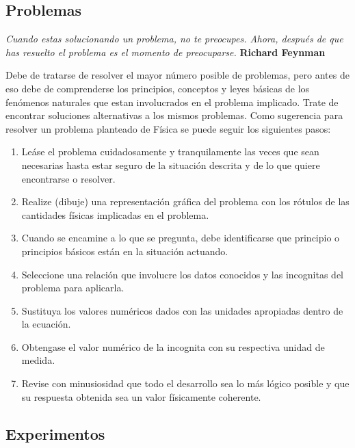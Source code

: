 \subsection*{Problemas}


\textit{Cuando estas solucionando un problema, no te preocupes. Ahora, después de que has resuelto el problema es el momento de 
preocuparse.} \textbf{Richard Feynman}
\vspace{1.0cm}

Debe de tratarse de resolver el mayor número posible de problemas, pero antes de eso debe de comprenderse los principios, 
conceptos y leyes básicas de los fenómenos naturales que estan involucrados en el problema implicado. Trate de encontrar 
soluciones alternativas a los mismos problemas. Como sugerencia para resolver un problema planteado de Física se puede seguir los 
siguientes pasos:\\

\begin{enumerate}
\item Leáse el problema cuidadosamente y tranquilamente las veces que sean necesarias hasta estar seguro de la situación descrita 
y de lo que quiere encontrarse o resolver.

\item Realize (dibuje) una representación gráfica del problema con los rótulos de las cantidades físicas implicadas en el 
problema.

\item Cuando se encamine a lo que se pregunta, debe identificarse que principio o principios básicos están en la situación 
actuando.

\item Seleccione una relación que involucre los datos conocidos y las incognitas del problema para aplicarla.

\item Sustituya los valores numéricos dados con las unidades apropiadas dentro de la ecuación.

\item Obtengase el valor numérico de la incognita con su respectiva unidad de medida.

\item Revise con minusiosidad que todo el desarrollo sea lo más lógico posible y que su respuesta obtenida sea un valor 
físicamente coherente.
 
\end{enumerate}

\subsection*{Experimentos}

